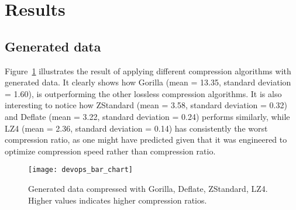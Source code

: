\section{Results}
\subsection{Generated data}
Figure~\ref{devops_lossless_compression} illustrates the result of applying different compression algorithms
with generated data. It clearly shows how Gorilla (mean = 13.35, standard deviation = 1.60), is outperforming the other
lossless compression algorithms.
It is also interesting to notice how ZStandard (mean = 3.58, standard deviation = 0.32) and Deflate
(mean = 3.22, standard deviation = 0.24)
performs similarly, while LZ4 (mean = 2.36, standard deviation = 0.14) has
consistently the worst compression ratio, as one might have predicted given that it was engineered to optimize compression speed rather
than compression ratio.

\begin{figure}[!htbp]
\begin{center}
\texttt{[image: devops\_bar\_chart]}
\caption[compression]{Generated data compressed with Gorilla, Deflate, ZStandard, LZ4.
Higher values indicates higher compression ratios.}
\label{devops_lossless_compression}
\end{center}
\end{figure}

